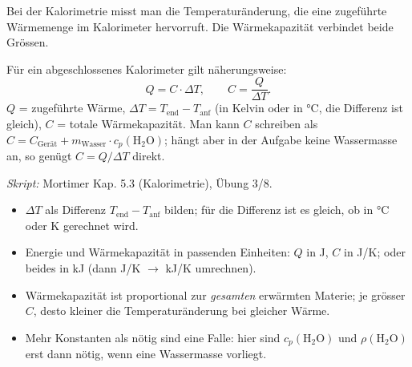 

Bei der Kalorimetrie misst man die Temperaturänderung, die eine zugeführte
Wärmemenge im Kalorimeter hervorruft. Die Wärmekapazität verbindet beide
Grössen.

\begin{werkzeugkasten}
Für ein abgeschlossenes Kalorimeter gilt näherungsweise:
\begin{equation}
  Q = C\cdot \Delta T, \qquad C = \frac{Q}{\Delta T}.
\end{equation}
$Q$ = zugeführte Wärme, $\Delta T = T_{\text{end}} - T_{\text{anf}}$
(in Kelvin oder in °C, die Differenz ist gleich), $C$ = totale
Wärmekapazität. Man kann $C$ schreiben als $C = C_{\text{Gerät}} +
m_{\text{Wasser}}\cdot c_p(\mathrm{H_2O})$; hängt aber in der Aufgabe keine
Wassermasse an, so genügt $C = Q/\Delta T$ direkt.

\textit{Skript:} Mortimer Kap. 5.3 (Kalorimetrie), Übung 3/8.
\end{werkzeugkasten}

\begin{achtung}
\begin{itemize}
  \item $\Delta T$ als Differenz $T_{\text{end}} - T_{\text{anf}}$ bilden;
        für die Differenz ist es gleich, ob in °C oder K gerechnet wird.
  \item Energie und Wärmekapazität in passenden Einheiten: $Q$ in J, $C$ in
        J/K; oder beides in kJ (dann J/K $\to$ kJ/K umrechnen).
  \item Wärmekapazität ist proportional zur \emph{gesamten} erwärmten
        Materie; je grösser $C$, desto kleiner die Temperaturänderung bei
        gleicher Wärme.
  \item Mehr Konstanten als nötig sind eine Falle: hier sind
        $c_p(\mathrm{H_2O})$ und $\rho(\mathrm{H_2O})$ erst dann nötig, wenn
        eine Wassermasse vorliegt.
\end{itemize}
\end{achtung}
